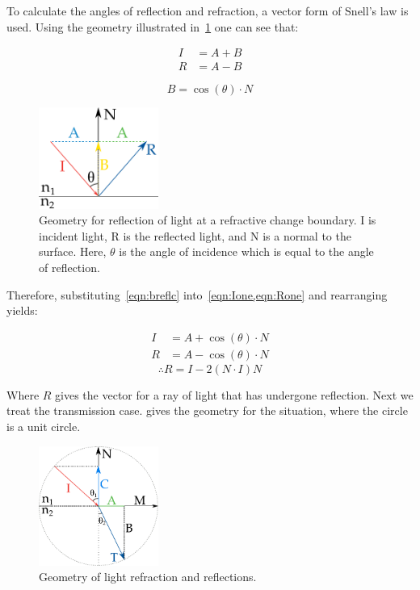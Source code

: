 \begin{appendices}
To calculate the angles of reflection and refraction, a vector form of Snell's law is used.
Using the geometry illustrated in~\cref{fig:reflcfig} one can see that:

\begin{align}
I &= A+B\label{eqn:Ione}\\
R &= A-B\label{eqn:Rone}
\end{align}

\begin{equation}
B=\cos(\theta)\cdot N
\label{eqn:breflc}
\end{equation}

\begin{figure}[!htpb]
    \centering
    \includegraphics[width=0.35\textwidth]{reflc.pdf}
    \caption{Geometry for reflection of light at a refractive change boundary. I is incident light, R is the reflected light, and N is a normal to the surface. Here, $\theta$ is the angle of incidence which is equal to the angle of reflection.}
    \label{fig:reflcfig}
\end{figure}

Therefore, substituting~\cref{eqn:breflc} into~\cref{eqn:Ione,eqn:Rone} and rearranging yields:

\begin{align}
I&=A+\cos\left(\theta\right)\cdot N\\
R&=A-\cos\left(\theta\right)\cdot N
\end{align}
\begin{equation}
\therefore R=I-2(N\cdot I) N\label{eqn:reflcfin}
\end{equation}

Where $R$ gives the vector for a ray of light that has undergone reflection.
Next we treat the transmission case.
 gives the geometry for the situation, where the circle is a unit circle.

\begin{figure}[!htpb]
    \centering
    \includegraphics[width=0.35\textwidth]{trans.pdf}
    \caption{Geometry of light refraction and reflections.}
    \label{fig:transfig}
\end{figure}


\end{appendices}
